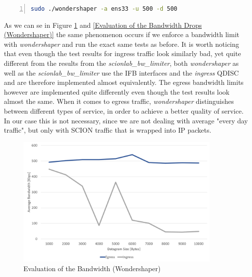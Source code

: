 \begin{lstlisting}[language=sh, caption = Wondershaper command, captionpos=b, numbers=left, frame=single, breaklines=true, breakatwhitespace=true, showstringspaces=false, label=Wondershaper command]
sudo ./wondershaper -a ens33 -u 500 -d 500
\end{lstlisting}

As we can se in Figure \ref{Evaluation of the Bandwidth (Wondershaper)} and \ref{Evaluation of the Bandwidth Drops (Wondershaper)} the same phenomenon occurs if we enforce a bandwidth limit with \textit{wondershaper} and run the exact same tests as before. It is worth noticing that even though the test results for ingress traffic look similarly bad, yet quite different from the results from the \textit{scionlab\_bw\_limiter}, both \textit{wondershaper} as well as the \textit{scionlab\_bw\_limiter} use the \acs{IFB} interfaces and the \textit{ingress} \acs{QDISC} and are therefore implemented almost equivalently. The egress bandwidth limits however are implemented quite differently even though the test results look almost the same. When it comes to egress traffic, \textit{wondershaper} distinguishes between different types of service, in order to achieve a better quality of service. In our case this is not necessary, since we are not dealing with average "every day traffic", but only with \acs{SCION} traffic that is wrapped into \acs{IP} packets.  

\begin{figure}[h]
	\centering
	\includegraphics[width=0.9\textwidth]{img/Evaluation-Bandwidth-Wondershaper.png}
	\caption{Evaluation of the Bandwidth (Wondershaper)}
	\label{Evaluation of the Bandwidth (Wondershaper)}
\end{figure}

